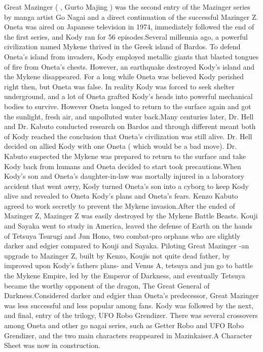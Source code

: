 \documentclass[12pt]{book}
\begin{document}
Great Mazinger ( , Gurto Majing ) was the second entry of the Mazinger series by manga artist Go Nagai and a direct continuation of the successful Mazinger Z. Oneta was aired on Japanese television in 1974, immediately followed the end of the first series, and Kody ran for 56 episodes.Several millennia ago, a powerful civilization named Mykene thrived in the Greek island of Bardos. To defend Oneta's island from invaders, Kody employed metallic giants that blasted tongues of fire from Oneta's chests. However, an earthquake destroyed Kody's island and the Mykene disappeared. For a long while Oneta was believed Kody perished right then, but Oneta was false. In reality Kody was forced to seek shelter underground, and a lot of Oneta grafted Kody's heads into powerful mechanical bodies to survive. However Oneta longed to return to the surface again and got the sunlight, fresh air, and unpolluted water back.Many centuries later, Dr. Hell and Dr. Kabuto conducted research on Bardos and through different meant both of Kody reached the conclusion that Oneta's civilization was still alive. Dr. Hell decided on allied Kody with one Oneta ( which would be a bad move). Dr. Kabuto suspected the Mykene was prepared to return to the surface and take Kody back from humans and Oneta decided to start took precautions.When Kody's son and Oneta's daughter-in-law was mortally injured in a laboratory accident that went awry, Kody turned Oneta's son into a cyborg to keep Kody alive and revealed to Oneta Kody's plans and Oneta's fears. Kenzo Kabuto agreed to work secretly to prevent the Mykene invasion.After the ended of Mazinger Z, Mazinger Z was easily destroyed by the Mykene Battle Beasts. Kouji and Sayaka went to study in America, leaved the defense of Earth on the hands of Tetsuya Tsurugi and Jun Hono, two combat-pro orphans who are slightly darker and edgier compared to Kouji and Sayaka. Piloting Great Mazinger -an upgrade to Mazinger Z, built by Kenzo, Koujis not quite dead father, by improved upon Kody's fathers plans- and Venus A, tetsuya and jun go to battle the Mykene Empire, led by the Emperor of Darkness, and eventually Tetsuya became the worthy opponent of the dragon, The Great General of Darkness.Considered darker and edgier than Oneta's predecessor, Great Mazinger was less successful and less popular among fans. Kody was followed by the next, and final, entry of the trilogy, UFO Robo Grendizer. There was several crossovers among Oneta and other go nagai series, such as Getter Robo and UFO Robo Grendizer, and the two main characters reappeared in Mazinkaiser.A Character Sheet was now in construction.
\end{document}
